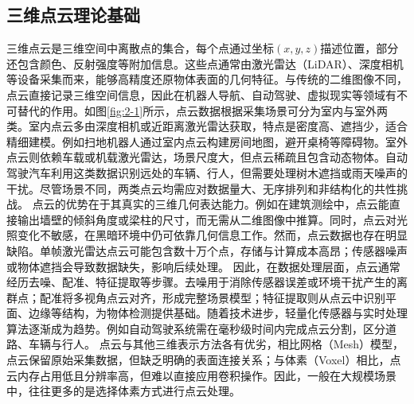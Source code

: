 \subsection{三维点云理论基础}
三维点云是三维空间中离散点的集合，每个点通过坐标$(x, y, z)$描述位置，部分还包含颜色、反射强度等附加信息。这些点通常由激光雷达（LiDAR）、深度相机等设备采集而来，能够高精度还原物体表面的几何特征。与传统的二维图像不同，点云直接记录三维空间信息，因此在机器人导航、自动驾驶、虚拟现实等领域有不可替代的作用。如图\ref{fig:2-1}所示，点云数据根据采集场景可分为室内与室外两类。室内点云多由深度相机或近距离激光雷达获取，特点是密度高、遮挡少，适合精细建模。例如扫地机器人通过室内点云构建房间地图，避开桌椅等障碍物。室外点云则依赖车载或机载激光雷达，场景尺度大，但点云稀疏且包含动态物体。自动驾驶汽车利用这类数据识别远处的车辆、行人，但需要处理树木遮挡或雨天噪声的干扰。尽管场景不同，两类点云均需应对数据量大、无序排列和非结构化的共性挑战。  
点云的优势在于其真实的三维几何表达能力。例如在建筑测绘中，点云能直接输出墙壁的倾斜角度或梁柱的尺寸，而无需从二维图像中推算。同时，点云对光照变化不敏感，在黑暗环境中仍可依靠几何信息工作。然而，点云数据也存在明显缺陷。单帧激光雷达点云可能包含数十万个点，存储与计算成本高昂；传感器噪声或物体遮挡会导致数据缺失，影响后续处理。%
因此，在数据处理层面，点云通常经历去噪、配准、特征提取等步骤。去噪用于消除传感器误差或环境干扰产生的离群点；配准将多视角点云对齐，形成完整场景模型；特征提取则从点云中识别平面、边缘等结构，为物体检测提供基础。随着技术进步，轻量化传感器与实时处理算法逐渐成为趋势。例如自动驾驶系统需在毫秒级时间内完成点云分割，区分道路、车辆与行人。%
点云与其他三维表示方法各有优劣，相比网格（Mesh）模型，点云保留原始采集数据，但缺乏明确的表面连接关系；与体素（Voxel）相比，点云内存占用低且分辨率高，但难以直接应用卷积操作。因此，一般在大规模场景中，往往更多的是选择体素方式进行点云处理。%
